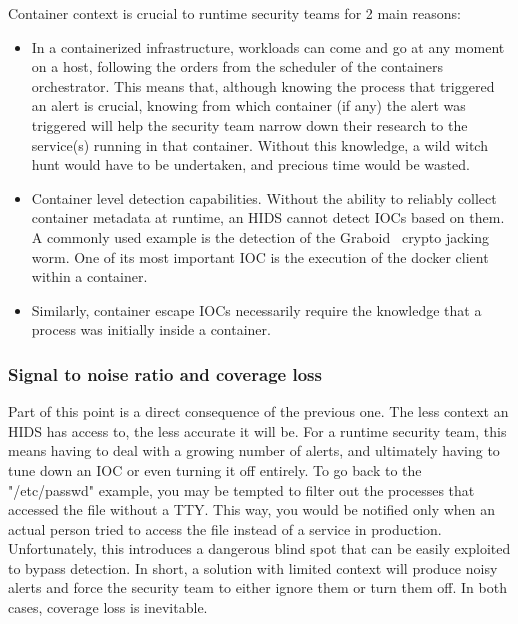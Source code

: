 Container context is crucial to runtime security teams for 2 main reasons:

\begin{itemize}
  \item In a containerized infrastructure, workloads can come and go at any moment on a host, following the orders from the scheduler of the containers orchestrator.
  This means that, although knowing the process that triggered an alert is crucial, knowing from which container (if any) the alert was triggered will help the security team narrow down their research to the service(s) running in that container.
  Without this knowledge, a wild witch hunt would have to be undertaken, and precious time would be wasted.
  \item Container level detection capabilities.
  Without the ability to reliably collect container metadata at runtime, an HIDS cannot detect IOCs based on them.
  A commonly used example is the detection of the Graboid~\cite{RuntimeSecurityMonitoringWithEBPF:Graboid} crypto jacking worm.
  One of its most important IOC is the execution of the docker client within a container.
  \item Similarly, container escape IOCs necessarily require the knowledge that a process was initially inside a container.
\end{itemize}

\subsubsection{Signal to noise ratio and coverage loss}

Part of this point is a direct consequence of the previous one.
The less context an HIDS has access to, the less accurate it will be.
For a runtime security team, this means having to deal with a growing number of alerts, and ultimately having to tune down an IOC or even turning it off entirely.
To go back to the "/etc/passwd" example, you may be tempted to filter out the processes that accessed the file without a TTY.
This way, you would be notified only when an actual person tried to access the file instead of a service in production.
Unfortunately, this introduces a dangerous blind spot that can be easily exploited to bypass detection.
In short, a solution with limited context will produce noisy alerts and force the security team to either ignore them or turn them off.
In both cases, coverage loss is inevitable.

